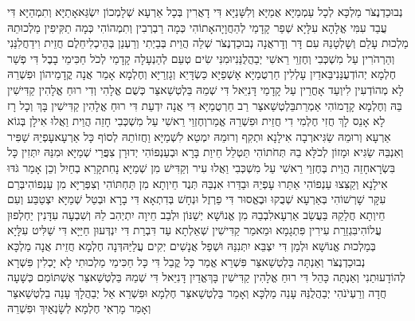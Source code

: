\documentclass[../main/main.tex]{subfiles}
\begin{document}
\begin{multicols*}{\ncols}
נְבוּכַדְנֶצֹּר מַלְכָּא לְכָל עַמְמַיָּא אֻמַיָּא וְלִשָּׁנַיָּא דִּי דָאֲרִין בְּכָל אַרְעָא שְׁלָמְכוֹן יִשְׂגֵּא\PreVerseSpace{}אָתַיָּא וְתִמְהַיָּא דִּי עֲבַד עִמִּי אֱלָהָא עִלָּיָא שְׁפַר קָדָמַי לְהַחֲוָיָה\PreVerseSpace{}אָתוֹהִי כְּמָה רַבְרְבִין וְתִמְהוֹהִי כְּמָה תַקִּיפִין מַלְכוּתֵהּ מַלְכוּת עָלַם וְשָׁלְטָנֵהּ עִם דָּר וְדָר\PreChapterSpace{}אֲנָה נְבוּכַדְנֶצֹּר שְׁלֵה הֲוֵית בְּבַיְתִי וְרַעְנַן בְּהֵיכְלִי\PreVerseSpace{}חֵלֶם חֲזֵית וִידַחֲלִנַּנִי וְהַרְהֹרִין עַל מִשְׁכְּבִי וְחֶזְוֵי רֵאשִׁי יְבַהֲלֻנַּנִי\PreVerseSpace{}וּמִנִּי שִׂים טְעֵם לְהַנְעָלָה קָדָמַי לְכֹל חַכִּימֵי בָבֶל דִּי פְשַׁר חֶלְמָא יְהוֹדְעֻנַּנִי\PreVerseSpace{}בֵּאדַיִן עָלְלִין חַרְטֻמַיָּא אָשְׁפַיָּא כַּשְׂדָּיֵא וְגָזְרַיָּא וְחֶלְמָא אָמַר אֲנָה קֳדָמֵיהוֹן וּפִשְׁרֵהּ לָא מְהוֹדְעִין לִי\PreVerseSpace{}וְעַד אָחֳרֵין עַל קָדָמַי דָּנִיֵּאל דִּי שְׁמֵהּ בֵּלְטְשַׁאצַּר כְּשֻׁם אֱלָהִי וְדִי רוּחַ אֱלָהִין קַדִּישִׁין בֵּהּ וְחֶלְמָא קָדָמוֹהִי אַמְרֵת\PreVerseSpace{}בֵּלְטְשַׁאצַּר רַב חַרְטֻמַיָּא דִּי אֲנָה יִדְעֵת דִּי רוּחַ אֱלָהִין קַדִּישִׁין בָּךְ וְכָל רָז לָא אָנֵס לָךְ חֲזִי\SubEnd{} חֶלְמִי דִי חֲזֵית וּפִשְׁרֵהּ אֱמַר\PreVerseSpace{}וְחֶזְוֵי רֵאשִׁי עַל מִשְׁכְּבִי חָזֵה הֲוֵית וַאֲלוּ אִילָן בְּגוֹא אַרְעָא וְרוּמֵהּ שַׂגִּיא\PreVerseSpace{}רְבָה אִילָנָא וּתְקִף וְרוּמֵהּ יִמְטֵא לִשְׁמַיָּא וַחֲזוֹתֵהּ לְסוֹף כָּל אַרְעָא\PreVerseSpace{}עָפְיֵהּ שַׁפִּיר וְאִנְבֵּהּ שַׂגִּיא וּמָזוֹן לְכֹלָּא בֵהּ תְּחֹתוֹהִי תַּטְלֵל חֵיוַת בָּרָא וּבְעַנְפוֹהִי יְדוּרָן\SubEnd{} צִפֲּרֵי שְׁמַיָּא וּמִנֵּהּ יִתְּזִין כָּל בִּשְׂרָא\PreVerseSpace{}חָזֵה הֲוֵית בְּחֶזְוֵי רֵאשִׁי עַל מִשְׁכְּבִי וַאֲלוּ עִיר וְקַדִּישׁ מִן שְׁמַיָּא נָחִת\PreVerseSpace{}קָרֵא בְחַיִל וְכֵן אָמַר גֹּדּוּ אִילָנָא וְקַצִּצוּ עַנְפוֹהִי אַתַּרוּ עָפְיֵהּ וּבַדַּרוּ אִנְבֵּהּ תְּנֻד חֵיוְתָא מִן תַּחְתּוֹהִי וְצִפְּרַיָּא מִן עַנְפוֹהִי\PreVerseSpace{}בְּרַם עִקָּר שָׁרְשׁוֹהִי בְּאַרְעָא שְׁבֻקוּ וּבֶאֱסוּר דִּי פַרְזֶל וּנְחָשׁ בְּדִתְאָא דִּי בָרָא וּבְטַל שְׁמַיָּא יִצְטַבַּע וְעִם חֵיוְתָא חֲלָקֵהּ בַּעֲשַׂב אַרְעָא\PreVerseSpace{}לִבְבֵהּ מִן אֱנוֹשָׁא יְשַׁנּוֹן וּלְבַב חֵיוָה יִתְיְהִב לֵהּ וְשִׁבְעָה עִדָּנִין יַחְלְפוּן עֲלוֹהִי\PreVerseSpace{}בִּגְזֵרַת עִירִין פִּתְגָמָא וּמֵאמַר קַדִּישִׁין שְׁאֵלְתָא עַד דִּבְרַת דִּי יִנְדְּעוּן חַיַּיָּא דִּי שַׁלִּיט עִלָּיָא בְּמַלְכוּת אֱנוֹשָׁא וּלְמַן דִּי יִצְבֵּא יִתְּנִנַּהּ וּשְׁפַל אֲנָשִׁים יְקִים עֲלַיַּהּ\PreVerseSpace{}דְּנָה חֶלְמָא חֲזֵית אֲנָה מַלְכָּא נְבוּכַדְנֶצֹּר וְאַנְתָּה בֵּלְטְשַׁאצַּר פִּשְׁרֵא אֱמַר כָּל קֳבֵל דִּי כָּל חַכִּימֵי מַלְכוּתִי לָא יָכְלִין פִּשְׁרָא לְהוֹדָעוּתַנִי וְאַנְתָּה כָּהֵל דִּי רוּחַ אֱלָהִין קַדִּישִׁין בָּךְ\PreVerseSpace{}אֱדַיִן דָּנִיֵּאל דִּי שְׁמֵהּ בֵּלְטְשַׁאצַּר אֶשְׁתּוֹמַם כְּשָׁעָה חֲדָה וְרַעְיֹנֹהִי יְבַהֲלֻנֵּהּ עָנֵה מַלְכָּא וְאָמַר בֵּלְטְשַׁאצַּר חֶלְמָא וּפִשְׁרֵא אַל יְבַהֲלָךְ עָנֵה בֵלְטְשַׁאצַּר וְאָמַר מָרְאִי חֶלְמָא לְשָׂנְאַיִךְ וּפִשְׁרֵהּ 
\end{multicols*}
\end{document}
